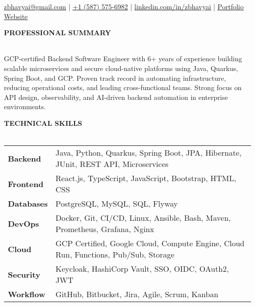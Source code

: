 \documentclass[a4paper]{article}
\newcommand{\lineunder} {
    \vspace*{0pt} \\
    {\color{Accent}\hspace*{-18pt} \hrulefill \hspace*{-6pt}} \\
}
\newcommand{\header} [1] {
    \vspace*{3pt}
    {\hspace*{-18pt} \textcolor{Accent}{\large\textbf{\MakeUppercase{#1}}}}
    \vspace*{-6pt} \lineunder
}
\begin{document}
\vspace*{-40pt}


\vspace*{-10pt}
\begin{center}
   {}
\end{center}
\vspace{-15pt}

\begin{center}
    \href{mailto:zbhavyai@gmail.com}{\uline{zbhavyai@gmail.com}} \quad|\quad
    \href{tel:+15875756982}{\uline{+1 (587) 575-6982}} \quad|\quad
    \href{https://linkedin.com/in/zbhavyai}{\uline{linkedin.com/in/zbhavyai}} \quad|\quad
    \href{https://zbhavyai.github.io}{\uline{Portfolio Website}}
\end{center}
\vspace{5pt}


\header{Professional Summary}

\vspace{-8pt}
\begin{justify}
GCP-certified Backend Software Engineer with 6+ years of experience building scalable microservices and secure cloud-native platforms using Java, Quarkus, Spring Boot, and GCP. Proven track record in automating infrastructure, reducing operational costs, and leading cross-functional teams. Strong focus on API design, observability, and AI-driven backend automation in enterprise environments.
\end{justify}


\header{Technical Skills}

\vspace{3pt}
\begin{tabular}{ l l }
    \textbf{Backend}    & Java, Python, Quarkus, Spring Boot, JPA, Hibernate, JUnit, REST API, Microservices    \\
    \textbf{Frontend}   & React.js, TypeScript, JavaScript, Bootstrap, HTML, CSS                                \\
    \textbf{Databases}  & PostgreSQL, MySQL, SQL, Flyway                                                        \\
    \textbf{DevOps}     & Docker, Git, CI/CD, Linux, Ansible, Bash, Maven, Prometheus, Grafana, Nginx           \\
    \textbf{Cloud}      & GCP Certified, Google Cloud, Compute Engine, Cloud Run, Functions, Pub/Sub, Storage   \\
    \textbf{Security}   & Keycloak, HashiCorp Vault, SSO, OIDC, OAuth2, JWT                                     \\
    \textbf{Workflow}   & GitHub, Bitbucket, Jira, Agile, Scrum, Kanban                                         \\
\end{tabular}
\vspace{8pt}
\end{document}
